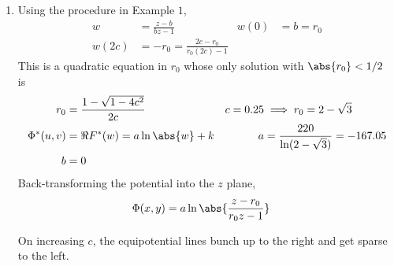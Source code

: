 \begin{enumerate}
    \item Using the procedure in Example $ 1 $,
          \begin{align}
              w     & = \frac{z - b}{bz - 1}                &
              w(0)  & = b = r_0                               \\
              w(2c) & = -r_0 = \frac{2c - r_0}{r_0(2c) - 1}
          \end{align}
          This is a quadratic equation in $ r_0 $ whose only solution with
          $ \abs{r_0} < 1/2 $ is\
          \begin{align}
              r_0          & = \frac{1 - \sqrt{1 - 4c^2}}{2c}          &
              c = 0.25     & \implies r_0 = 2 - \sqrt{3}                 \\
              \Phi^*(u, v) & = \Re{F^*(w)} = a\ln\abs{w} + k           &
              a            & = \frac{220}{\ln(2 - \sqrt{3})} = -167.05   \\
              b            & = 0
          \end{align}
          Back-transforming the potential into the $ z $ plane,
          \begin{align}
              \Phi(x, y) & = a \ln \abs{\frac{z - r_0}{r_0 z - 1}}
          \end{align}
          \begin{figure}[H]
              \centering
          \end{figure}
          On increasing $ c $, the equipotential lines bunch up to the right and get
          sparse to the left.


\end{enumerate}
